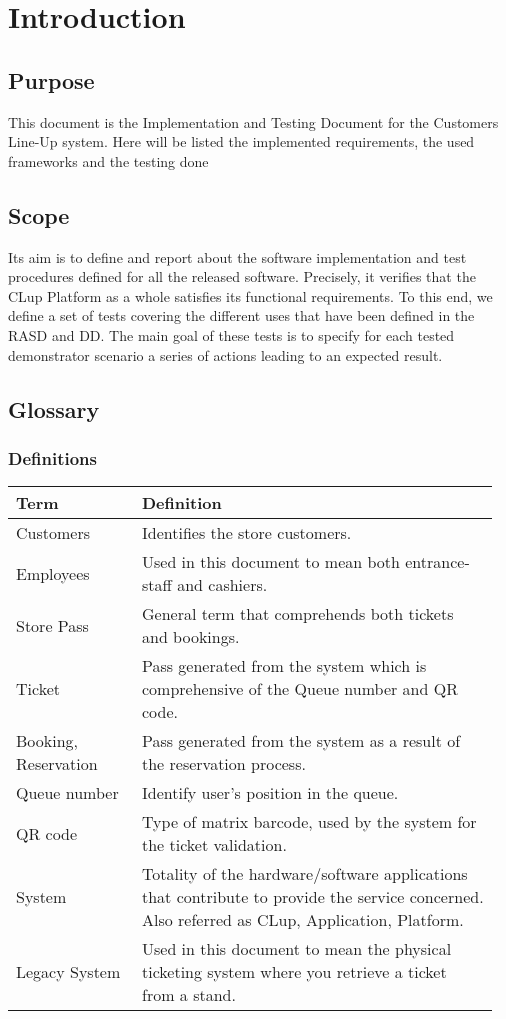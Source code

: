\chapter{Introduction}

\section{Purpose}
This document is the Implementation and Testing Document for the Customers Line-Up system. Here will be listed the implemented requirements, the used frameworks and the testing done

\section{Scope}
Its aim is to define and report about the software implementation and test procedures defined for all the released software. Precisely, it verifies that the CLup Platform as a whole satisfies its functional requirements. To this end, we define a set of tests covering the different uses that have been defined in the RASD and DD. The main goal of these tests  is  to  specify  for  each  tested  demonstrator scenario a series of actions leading to an expected result.

\section{Glossary}
\subsection{Definitions}
\begin{center}
	\begin{tabular}{@{}p{0.25\linewidth} p{0.71\linewidth}@{}}
		\toprule
		\textbf{Term} & \textbf{Definition}\\
		\midrule
		Customers &  Identifies the store customers.\\
		Employees & Used in this document to mean both entrance-staff and cashiers.\\
		Store Pass & General term that comprehends both tickets and bookings.\\
		Ticket & Pass generated from the system which is comprehensive of the Queue number and QR code.\\
		Booking, Reservation & Pass generated from the system as a result of the reservation process.\\
		Queue number & Identify user's position in the queue.\\
		QR code & Type of matrix barcode, used by the system for the ticket validation.\\
		System & Totality of the hardware/software applications that contribute to provide the service concerned. Also referred as CLup, Application, Platform.\\
		Legacy System & Used in this document to mean the physical ticketing system where you retrieve a ticket from a stand.\\
		\bottomrule
	\end{tabular}
\end{center}

